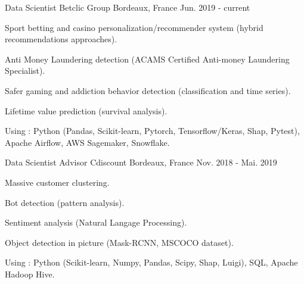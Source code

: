 

\begin{cventries}

  \cventry
    {Data Scientist} %
    {Betclic Group} %
    {Bordeaux, France} %
    {Jun. 2019 - current} %
    {
      \begin{cvitems} %
        \item {Sport betting and casino personalization/recommender system (hybrid recommendations approaches).}
        \item {Anti Money Laundering detection (ACAMS Certified Anti-money Laundering Specialist).}
        \item {Safer gaming and addiction behavior detection (classification and time series).}
        \item {Lifetime value prediction (survival analysis).}
      \end{cvitems}
    \vspace{9} 
    Using : Python (Pandas, Scikit-learn, Pytorch, Tensorflow/Keras, Shap, Pytest), Apache Airflow, AWS Sagemaker, Snowflake.
    }

  \cventry
    {Data Scientist Advisor} %
    {Cdiscount} %
    {Bordeaux, France} %
    {Nov. 2018 - Mai. 2019} %
    {
       \begin{cvitems} %
        \item {Massive customer clustering.}
        \item {Bot detection (pattern analysis).}
        \item {Sentiment analysis (Natural Langage Processing).}
        \item {Object detection in picture (Mask-RCNN, MSCOCO dataset).}
      \end{cvitems}
      \vspace{9} 
    Using : Python (Scikit-learn, Numpy, Pandas, Scipy, Shap, Luigi), SQL, Apache Hadoop Hive.
    }


\end{cventries}
